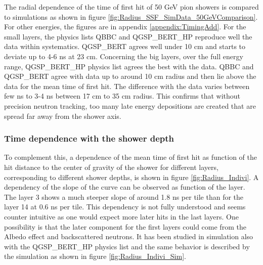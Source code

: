 The radial dependence of the time of first hit of 50 GeV pion showers is compared to simulations as shown in figure \ref{fig:Radius_SSF_SimData_50GeVComparison}. For other energies, the figures are in appendix \ref{appendix:TimingAdd}. For the small layers, the physics lists QBBC and QGSP\_BERT\_HP reproduce well the data within systematics. QGSP\_BERT agrees well under 10 cm and starts to deviate up to 4-6 ns at 23 cm. Concerning the big layers, over the full energy range, QGSP\_BERT\_HP physics list agrees the best with the data. QBBC and QGSP\_BERT agree with data up to around 10 cm radius and then lie above the data for the mean time of first hit. The difference with the data varies between few ns to 3-4 ns between 17 cm to 35 cm radius. This confirms that without precision neutron tracking, too many late energy depositions are created that are spread far away from the shower axis.

\subsubsection{Time dependence with the shower depth}
\label{sec:TimeRadiusDepth}

To complement this, a dependence of the mean time of first hit as function of the hit distance to the center of gravity of the shower for different layers, corresponding to different shower depths, is shown in figure \ref{fig:Radius_Indivi}. A dependency of the slope of the curve can be observed as function of the layer. The layer 3 shows a much steeper slope of around 1.8 ns per tile than for the layer 14 at 0.6 ns per tile. This dependency is not fully understood and seems counter intuitive as one would expect more later hits in the last layers. One possibility is that the later component for the first layers could come from the Albedo effect \cite{ELLSWORTH1982167} and backscattered neutrons. It has been studied in simulation also with the QGSP\_BERT\_HP physics list and the same behavior is described by the simulation as shown in figure \ref{fig:Radius_Indivi_Sim}.


